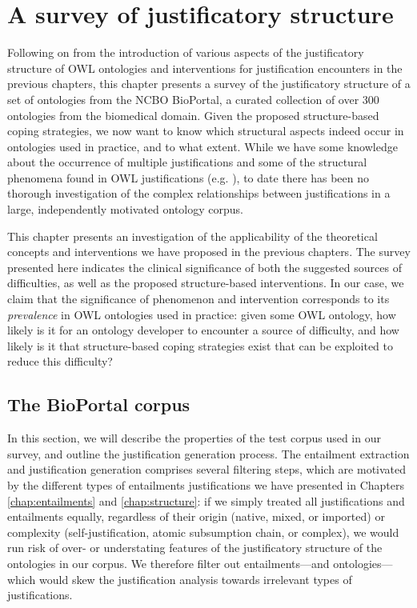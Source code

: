 \chapter{A survey of justificatory structure}
\label{chap:survey}

Following on from the introduction of various aspects of the justificatory structure of OWL ontologies and interventions for justification encounters in the previous chapters, this chapter presents a survey of the justificatory structure of a set of ontologies from the NCBO BioPortal, a curated collection of over 300 ontologies from the biomedical domain. Given the proposed structure-based coping strategies, we now want to know which structural aspects indeed occur in ontologies used in practice, and to what extent. While we have some knowledge about the occurrence of multiple justifications and some of the structural phenomena found in OWL justifications (e.g. \cite{kalyanpur07oq,horridge11gj,bail11jm}), to date there has been no thorough investigation of the complex relationships between justifications in a large, independently motivated ontology corpus.  

This chapter presents an investigation of the applicability of the theoretical concepts and interventions we have proposed in the previous chapters. The survey presented here indicates the  clinical significance of both the suggested sources of difficulties, as well as the proposed structure-based interventions. In our case, we claim that the significance of phenomenon and intervention corresponds to its \emph{prevalence} in OWL ontologies used in practice: given some OWL ontology, how likely is it for an ontology developer to encounter a source of difficulty, and how likely is it that structure-based coping strategies exist that can be exploited to reduce this difficulty?




\section{The BioPortal corpus}

In this section, we will describe the properties of the test corpus used in our survey, and outline the justification generation process. The entailment extraction and justification generation comprises several filtering steps, which are motivated by the different types of entailments justifications we have presented in Chapters \ref{chap:entailments} and \ref{chap:structure}: if we simply treated all justifications and entailments equally, regardless of their origin (native, mixed, or imported) or complexity (self-justification, atomic subsumption chain, or complex), we would run risk of over- or understating features of the justificatory structure of the ontologies in our corpus. We therefore filter out entailments---and ontologies---which would skew the justification analysis towards irrelevant types of justifications.


